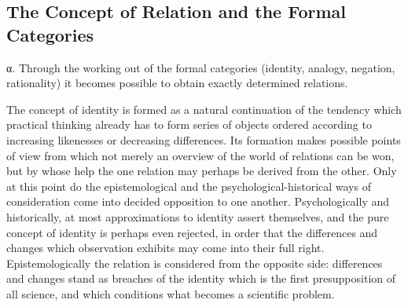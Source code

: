 \documentclass[12pt]{article}
\newcommand{\opage}[1]{\marginnote{\footnotesize\textit{[#1]}}}
\begin{document}
\subsection{The Concept of Relation and the Formal Categories}
\label{sec:3b}
%

%
\label{sec:3b-alpha}%
α. Through the working out of the formal categories (identity, analogy,
negation, rationality) it becomes possible to obtain exactly determined
relations.

The concept of identity is formed as a natural continuation of the tendency
which practical thinking already has to form series of objects ordered
according to increasing likenesses or decreasing differences. Its formation
\opage{34}makes possible points of view from which not merely an overview of the world
of relations can be won, but by whose help the one relation may perhaps be
derived from the other. Only at this point do the epistemological and the
psychological-historical ways of consideration come into decided opposition
to one another. Psychologically and historically, at most approximations to
identity assert themselves, and the pure concept of identity is perhaps even
rejected, in order that the differences and changes which observation
exhibits may come into their full right. Epistemologically the relation is
considered from the opposite side: differences and changes stand as breaches
of the identity which is the first presupposition of all science, and which
conditions what becomes a scientific problem.
\end{document}
